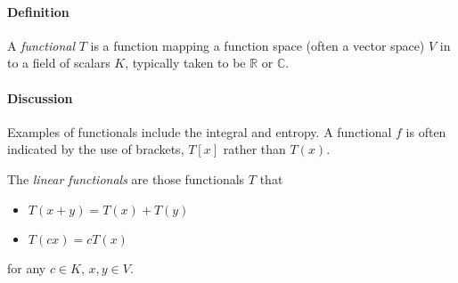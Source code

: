 \documentclass[12pt]{article}
\newcommand{\mb}{\mathbb}
\newcommand{\R}{\mb{R}}
\newcommand{\<}{\langle}
\renewcommand{\>}{\rangle}
\begin{document}
\paragraph{Definition}
A \emph{functional} $T$ is a function mapping a function space (often a vector space) $V$ in to a field of scalars $K$, typically taken to be $\R$ or $\mathbb{C}$.  

\paragraph{Discussion}
Examples of functionals include the integral and entropy.  A functional $f$ is often indicated by the use of  brackets, $T[x]$ rather than $T(x)$.

The \emph{linear functionals} are those functionals $T$ that 
\begin{itemize}
\item $T(x+y)=T(x)+T(y)$
\item $T(cx)=cT(x)$
\end{itemize}
for any $c\in K$, $x,y\in V$.
\end{document}

